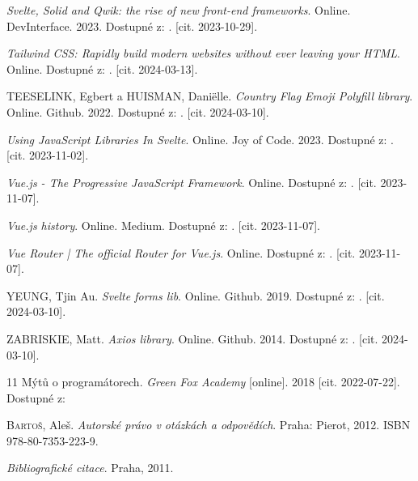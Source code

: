 \begin{thebibliography}{99}
\emph{Svelte, Solid and Qwik: the rise of new front-end frameworks}. Online. DevInterface. 2023. Dostupné z: . [cit. 2023-10-29].

\emph{Tailwind CSS: Rapidly build modern websites without ever leaving your HTML}. Online. Dostupné z: . [cit. 2024-03-13].

\textsc{TEESELINK}, Egbert a \textsc{HUISMAN}, Daniëlle. \emph{Country Flag Emoji Polyfill library}. Online. Github. 2022. Dostupné z: . [cit. 2024-03-10].

\emph{Using JavaScript Libraries In Svelte}. Online. Joy of Code. 2023. Dostupné z: . [cit. 2023-11-02].

\emph{Vue.js - The Progressive JavaScript Framework}. Online. Dostupné z: . [cit. 2023-11-07].

\emph{Vue.js history}. Online. Medium. Dostupné z: . [cit. 2023-11-07].

\emph{Vue Router | The official Router for Vue.js}. Online. Dostupné z: . [cit. 2023-11-07].

\textsc{YEUNG}, Tjin Au. \emph{Svelte forms lib}. Online. Github. 2019. Dostupné z: . [cit. 2024-03-10].

\textsc{ZABRISKIE}, Matt. \emph{Axios library}. Online. Github. 2014. Dostupné z: . [cit. 2024-03-10].



11 Mýtů o programátorech. \emph{Green Fox Academy} [online]. 2018 [cit. 2022-07-22]. Dostupné z: 

\textsc{Bartoš}, Aleš. \emph{Autorské právo v otázkách a odpovědích}. Praha: Pierot, 2012. ISBN 978-80-7353-223-9.

\emph{Bibliografické citace}. Praha, 2011.


\end{thebibliography}
